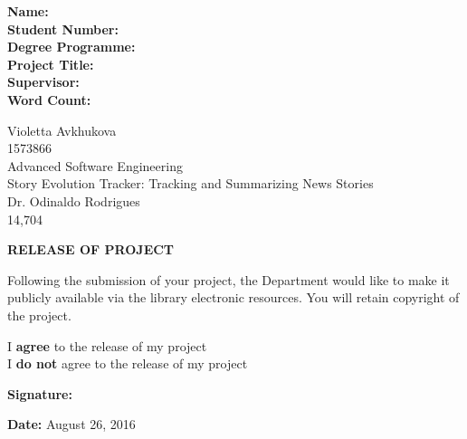 \documentclass[11pt,titlepage]{report}
\begin{document}
\begin{titlepage}
\begin{minipage}{0.3\textwidth}
\begin{flushleft}
		\textbf{Name:\\Student Number:\\Degree Programme:\\Project Title:\\ Supervisor:\\ Word Count:\\}
	\end{flushleft}
\end{minipage}
\begin{minipage}{0.7\textwidth}
	\begin{flushleft}
		\doublespacing
		Violetta Avkhukova \\ 1573866 \\ Advanced Software Engineering \\ Story Evolution Tracker: Tracking and Summarizing News Stories \\ Dr. Odinaldo Rodrigues \\ 14,704
	\end{flushleft}
\end{minipage}
\begin{minipage}{\textwidth}
	\vspace{1.5cm}
	\begin{framed}
		\begin{center}
			\textbf{RELEASE OF PROJECT}
		\end{center}
		Following the submission of your project, the Department would like to make it publicly available via the library electronic resources. You will retain copyright of the project.
	\end{framed}
\end{minipage}
\begin{flushleft}
	\doublespacing
	\hspace{1em}\makebox[0pt][l]{$\square$}\raisebox{.15ex}{\hspace{0.1em}$\checkmark$} I \textbf{agree} to the release of my project \\
	\hspace{1em}\makebox[0pt][l]{$\square$}\hspace{1em} I \textbf{do not} agree to the release of my project
\end{flushleft}
\begin{minipage}{0.5\textwidth}
	\vspace{2cm}
	\begin{flushleft}
		\textbf{Signature:}
	\end{flushleft}
\end{minipage}
\begin{minipage}{0.5\textwidth}
	\vspace{2cm}
	\begin{flushleft}
		\textbf{Date:} August 26, 2016
	\end{flushleft}
\end{minipage}
\end{titlepage}
\end{document}
